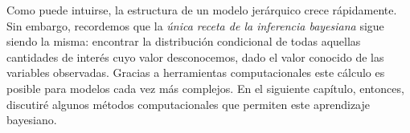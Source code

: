 Como puede intuirse, la estructura de un modelo jerárquico crece rápidamente. Sin embargo, recordemos que la \textit{única receta de la inferencia bayesiana} sigue siendo la misma: encontrar la distribución condicional de todas aquellas cantidades de interés cuyo valor desconocemos, dado el valor conocido de las variables observadas. Gracias a herramientas computacionales este cálculo es posible para modelos cada vez más complejos. En el siguiente capítulo, entonces, discutiré algunos métodos computacionales que permiten este aprendizaje bayesiano. 
